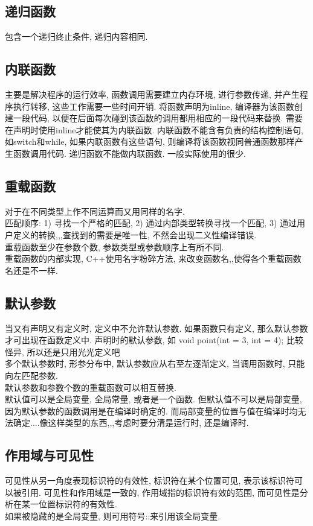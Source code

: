 \documentclass[a4paper,10pt,english]{article}
\begin{document}
\subsection {递归函数}
包含一个递归终止条件, 递归内容相同. 

\subsection {内联函数}
主要是解决程序的运行效率, 函数调用需要建立内存环境, 进行参数传递, 并产生程序执行转移, 这些工作需要一些时间开销. 将函数声明为inline, 编译器为该函数创建一段代码, 以便在后面每次碰到该函数的调用都用相应的一段代码来替换. 需要在声明时使用inline才能使其为内联函数. 内联函数不能含有负责的结构控制语句, 如switch和while, 如果内联函数有这些语句, 则编译将该函数视同普通函数那样产生函数调用代码. 递归函数不能做内联函数. 一般实际使用的很少.

\subsection {重载函数}
对于在不同类型上作不同运算而又用同样的名字. \\
匹配顺序: 1) 寻找一个严格的匹配, 2) 通过内部类型转换寻找一个匹配, 3) 通过用户定义的转换,,,查找到的需要是唯一性, 不然会出现二义性编译错误. \\
重载函数至少在参数个数, 参数类型或参数顺序上有所不同.\\
重载函数的内部实现, C++使用名字粉碎方法, 来改变函数名,,使得各个重载函数名还是不一样.

\subsection {默认参数}
当又有声明又有定义时, 定义中不允许默认参数. 如果函数只有定义, 那么默认参数才可出现在函数定义中. 声明时的默认参数, 如 void point(int = 3, int = 4); 比较怪异, 所以还是只用光光定义吧\\
多个默认参数时, 形参分布中, 默认参数应从右至左逐渐定义, 当调用函数时, 只能向左匹配参数. \\
默认参数和参数个数的重载函数可以相互替换. \\
默认值可以是全局变量, 全局常量, 或者是一个函数. 但默认值不可以是局部变量, 因为默认参数的函数调用是在编译时确定的. 而局部变量的位置与值在编译时均无法确定....像这样类型的东西,,,考虑时要分清是运行时, 还是编译时.

\subsection {作用域与可见性}
可见性从另一角度表现标识符的有效性, 标识符在某个位置可见, 表示该标识符可以被引用. 可见性和作用域是一致的, 作用域指的标识符有效的范围, 而可见性是分析在某一位置标识符的有效性.\\
如果被隐藏的是全局变量, 则可用符号::来引用该全局变量.
\end{document}
